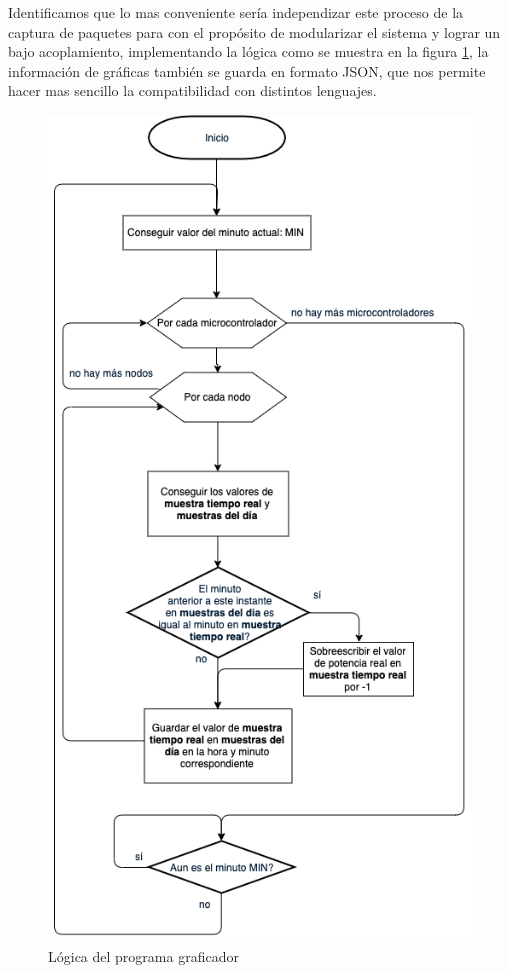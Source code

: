 Identificamos que lo mas conveniente sería independizar este proceso de la captura de paquetes para con el propósito de modularizar el sistema y lograr un bajo acoplamiento, implementando la lógica como se muestra en la figura \ref{fig:programa graficador}, la información de gráficas también se guarda en formato JSON, que nos permite hacer mas sencillo la compatibilidad con distintos lenguajes.

\begin{figure}[H]
	\centering
	\includegraphics[scale=.5]{Capitulo5/images/logica_graficador.png}
	\caption{Lógica del programa graficador}
	\label{fig:programa graficador}
\end{figure} 


